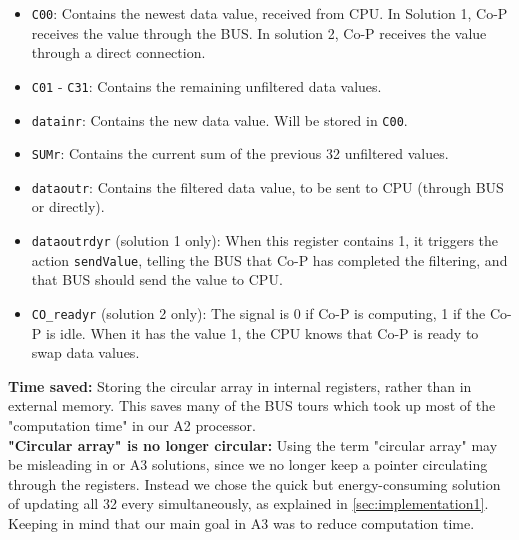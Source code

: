 \begin{itemize}
    \item \texttt{C00}: Contains the newest data value, received from CPU. In Solution 1, Co-P receives the value through the BUS. In solution 2, Co-P receives the value through a direct connection.
    \item \texttt{C01} - \texttt{C31}: Contains the remaining unfiltered data values.
    \item \texttt{datainr}: Contains the new data value. Will be stored in \texttt{C00}.
       \item \texttt{SUMr}: Contains the current sum of the previous 32 unfiltered values. 
    \item \texttt{dataoutr}: Contains the filtered data value, to be sent to CPU (through BUS or directly).
    \item \texttt{dataoutrdyr} (solution 1 only): When this register contains 1, it triggers the action \texttt{sendValue}, telling the BUS that Co-P has completed the filtering, and that BUS should send the value to CPU.
    \item \texttt{CO\_readyr} (solution 2 only): The signal is 0 if Co-P is computing, 1 if the Co-P is idle. When it has the value 1, the CPU knows that Co-P is ready to swap data values.

\end{itemize}

\textbf{Time saved:} Storing the circular array in internal registers, rather than in external memory. This saves many of the BUS tours which took up most of the "computation time" in our A2 processor. \\

\textbf{"Circular array" is no longer circular:} Using the term "circular array" may be misleading in or A3 solutions, since we no longer keep a pointer circulating through the registers.
Instead we chose the quick but energy-consuming solution of updating all 32 every simultaneously, as explained in \ref{sec:implementation1}. Keeping in mind that our main goal in A3 was to reduce computation time.